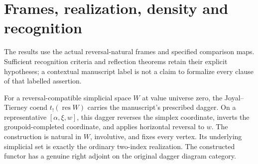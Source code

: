 \section{Frames, realization, density and recognition}

The results use the actual reversal-natural frames and specified comparison maps. Sufficient recognition criteria and reflection theorems retain their explicit hypotheses; a contextual manuscript label is not a claim to formalize every clause of that labelled assertion.

\begin{resultblock}
\begin{proposition}
\label{catalogue:F1}
For a reversal-compatible simplicial space $W$ at value universe zero, the Joyal--Tierney coend $t_!(\operatorname{res}W)$ carries the manuscript's prescribed dagger.
On a representative $[\alpha,\xi,w]$, this dagger reverses the simplex coordinate, inverts the groupoid-completed coordinate, and applies horizontal reversal to $w$.
The construction is natural in $W$, involutive, and fixes every vertex.
Its underlying simplicial set is exactly the ordinary two-index realization.
The constructed functor has a genuine right adjoint on the original dagger diagram category.
\end{proposition}

\end{resultblock}

